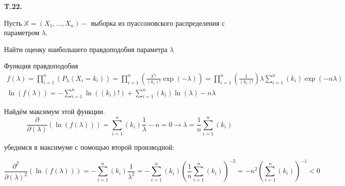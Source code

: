\documentclass[a4paper,12pt]{article} %
\begin{document}
\begin{example} \textbf{T.22.} 

Пусть $\mathbb{X}=\left(X_{1}, \ldots, X_{n}\right)-$ выборка из пуассоновского распределения
с параметром $\lambda .$ 

Найти оценку наибольшего правдоподобия параметра
$\lambda$



Функция правдоподобия
$$
\begin{array}{c}
f(\lambda)=\prod_{i=1}^{n}\left(P_{\lambda}\left(X_{i}=k_{i}\right)\right)
=
\prod_{i=1}^{n}\left(\frac{\lambda^{k_{i}}}{\left(k_{i}\right) !} \exp (-\lambda)\right)
=
\prod_{i=1}^{n}\left(\frac{1}{\left(k_{i}\right) !}\right) \lambda \sum_{i=1}^{n}\left(k_{i}\right) \exp (-n \lambda) 
\\
\ln (f(\lambda))=-\sum_{i=1}^{n} \ln \left(\left(k_{i}\right) !\right)+\sum_{i=1}^{n}\left(k_{i}\right) \ln (\lambda)-n \lambda
\end{array}
$$



Найдём максимум этой функции.
$$
\frac{\partial}{\partial(\lambda)}(\ln (f(\lambda)))=\sum_{i=1}^{n}\left(k_{i}\right) \frac{1}{\lambda}-n=0 \rightarrow \lambda=\frac{1}{n} \sum_{i=1}^{n}\left(k_{i}\right)
$$


убедимся в максимуме с помощью второй производной:


$$
\frac{\partial^{2}}{\partial(\lambda)^{2}}(\ln (f(\lambda)))=-\sum_{i=1}^{n}\left(k_{i}\right) \frac{1}{\lambda^{2}}=-\sum_{i=1}^{n}\left(k_{i}\right)\left(\frac{1}{n} \sum_{i=1}^{n}\left(k_{i}\right)\right)^{-2}=-n^{2}\left(\sum_{i=1}^{n}\left(k_{i}\right)\right)^{-1}<0
$$











\end{example}
\end{document}
